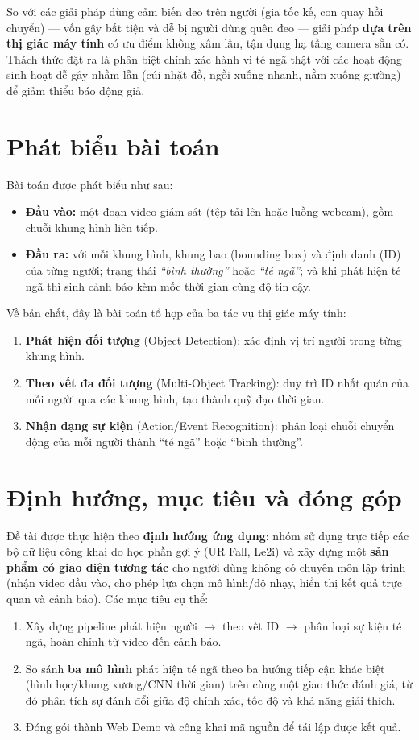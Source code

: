 \documentclass[fontsize=13pt,a4paper,oneside,DIV=calc,chapterprefix=true]{scrbook}
\begin{document}
So với các giải pháp dùng cảm biến đeo trên người (gia tốc kế, con quay hồi chuyển) --- vốn gây bất tiện và dễ bị người dùng quên đeo --- giải pháp \textbf{dựa trên thị giác máy tính} có ưu điểm không xâm lấn, tận dụng hạ tầng camera sẵn có. Thách thức đặt ra là phân biệt chính xác hành vi té ngã thật với các hoạt động sinh hoạt dễ gây nhầm lẫn (cúi nhặt đồ, ngồi xuống nhanh, nằm xuống giường) để giảm thiểu báo động giả.

\section{Phát biểu bài toán}
Bài toán được phát biểu như sau:
\begin{itemize}[leftmargin=1.2cm]
    \item \textbf{Đầu vào:} một đoạn video giám sát (tệp tải lên hoặc luồng webcam), gồm chuỗi khung hình liên tiếp.
    \item \textbf{Đầu ra:} với mỗi khung hình, khung bao (bounding box) và định danh (ID) của từng người; trạng thái \emph{``bình thường''} hoặc \emph{``té ngã''}; và khi phát hiện té ngã thì sinh cảnh báo kèm mốc thời gian cùng độ tin cậy.
\end{itemize}
Về bản chất, đây là bài toán tổ hợp của ba tác vụ thị giác máy tính:
\begin{enumerate}[leftmargin=1.2cm]
    \item \textbf{Phát hiện đối tượng} (Object Detection): xác định vị trí người trong từng khung hình.
    \item \textbf{Theo vết đa đối tượng} (Multi-Object Tracking): duy trì ID nhất quán của mỗi người qua các khung hình, tạo thành quỹ đạo thời gian.
    \item \textbf{Nhận dạng sự kiện} (Action/Event Recognition): phân loại chuỗi chuyển động của mỗi người thành ``té ngã'' hoặc ``bình thường''.
\end{enumerate}

\section{Định hướng, mục tiêu và đóng góp}
Đề tài được thực hiện theo \textbf{định hướng ứng dụng}: nhóm sử dụng trực tiếp các bộ dữ liệu công khai do học phần gợi ý (UR Fall, Le2i) và xây dựng một \textbf{sản phẩm có giao diện tương tác} cho người dùng không có chuyên môn lập trình (nhận video đầu vào, cho phép lựa chọn mô hình/độ nhạy, hiển thị kết quả trực quan và cảnh báo). Các mục tiêu cụ thể:
\begin{enumerate}[leftmargin=1.2cm]
    \item Xây dựng pipeline phát hiện người $\rightarrow$ theo vết ID $\rightarrow$ phân loại sự kiện té ngã, hoàn chỉnh từ video đến cảnh báo.
    \item So sánh \textbf{ba mô hình} phát hiện té ngã theo ba hướng tiếp cận khác biệt (hình học/khung xương/CNN thời gian) trên cùng một giao thức đánh giá, từ đó phân tích sự đánh đổi giữa độ chính xác, tốc độ và khả năng giải thích.
    \item Đóng gói thành Web Demo và công khai mã nguồn để tái lập được kết quả.
\end{enumerate}
\end{document}
